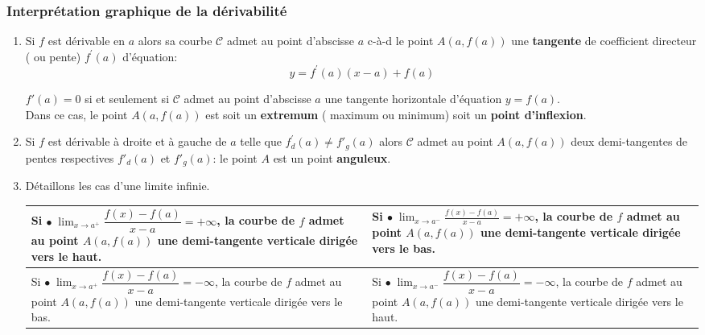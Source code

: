 \subsubsection*{Interprétation graphique de la dérivabilité}
\begin{enumerate}
\item Si $ f $ est dérivable en $ a $ alors sa courbe $ \mathcal{C} $ admet au point d'abscisse  $ a $  c-à-d le point $A(a,f(a))$ une \textbf{ tangente} de coefficient directeur ( ou pente) $  f^{'}(a)$ d'équation:  
$$ y=f^{'}(a)(x-a)+ f(a) $$


\begin{remark}
 $  f'(a)=0$  si et seulement si $ \mathcal{C} $ admet au point d'abscisse  $ a $ une tangente horizontale d'équation $ y=f(a). $ \\ Dans ce cas, le point $A(a,f(a))$  est  soit un \textbf{extremum} ( maximum ou minimum) soit un \textbf{point d'inflexion}.
\end{remark}
 \item Si $ f $ est dérivable  à droite et à gauche  de $ a $ telle que $ f^{'}_{d}(a)\neq f'_{g}(a) $ alors $ \mathcal{C} $ admet au  point $A(a,f(a))$ deux demi-tangentes de pentes respectives  $ f'_{d}(a)$ et $ f'_{g}(a) $: le point $A$ est un point \textbf{anguleux}.
 \item Détaillons les cas d'une limite infinie.

\medskip
\begin{tabularx}{\textwidth}{|X|X|}
\hline
Si $ \bullet\; \displaystyle \lim_{x \to a^+} \dfrac{f(x)-f(a)}{x-a} = +\infty$, la courbe de $f$ admet au point $A(a, f(a))$ une demi-tangente verticale dirigée vers le haut. 
&
Si $ \bullet\; \displaystyle \lim_{x \to a^-} \frac{f(x)-f(a)}{x-a} = +\infty$, la courbe de $f$ admet au point $A(a, f(a))$ une demi-tangente verticale dirigée vers le bas. 
\\
\hline
Si $\bullet\; \displaystyle \lim_{x \to a^+} \dfrac{f(x)-f(a)}{x-a} = -\infty$, la courbe de $f$ admet au point $A(a, f(a))$ une demi-tangente verticale dirigée vers le bas. 
&
Si $\bullet\; \displaystyle \lim_{x \to a^-} \dfrac{f(x)-f(a)}{x-a} = -\infty$, la courbe de $f$ admet au point $A(a, f(a))$ une demi-tangente verticale dirigée vers le haut. 
\\
\hline
\end{tabularx}


\end{enumerate}
